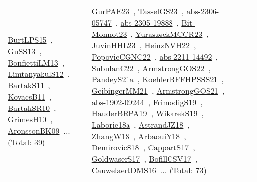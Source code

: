 {\begin{longtable}{lp{3cm}>{\raggedright\arraybackslash}p{6cm}>{\raggedright\arraybackslash}p{6cm}>{\raggedright\arraybackslash}p{8cm}}
\href{papers/BurtLPS15.pdf}{BurtLPS15}~\cite{BurtLPS15}, \href{papers/GuSS13.pdf}{GuSS13}~\cite{GuSS13}, \href{papers/BonfiettiLM13.pdf}{BonfiettiLM13}~\cite{BonfiettiLM13}, \href{articles/LimtanyakulS12.pdf}{LimtanyakulS12}~\cite{LimtanyakulS12}, \href{articles/BartakS11.pdf}{BartakS11}~\cite{BartakS11}, \href{articles/KovacsB11.pdf}{KovacsB11}~\cite{KovacsB11}, \href{articles/BartakSR10.pdf}{BartakSR10}~\cite{BartakSR10}, \href{papers/GrimesH10.pdf}{GrimesH10}~\cite{GrimesH10}, \href{papers/AronssonBK09.pdf}{AronssonBK09}~\cite{AronssonBK09}... (Total: 39) & \href{articles/GurPAE23.pdf}{GurPAE23}~\cite{GurPAE23}, \href{papers/TasselGS23.pdf}{TasselGS23}~\cite{TasselGS23}, \href{articles/abs-2306-05747.pdf}{abs-2306-05747}~\cite{abs-2306-05747}, \href{articles/abs-2305-19888.pdf}{abs-2305-19888}~\cite{abs-2305-19888}, \href{papers/Bit-Monnot23.pdf}{Bit-Monnot23}~\cite{Bit-Monnot23}, \href{articles/YuraszeckMCCR23.pdf}{YuraszeckMCCR23}~\cite{YuraszeckMCCR23}, \href{papers/JuvinHHL23.pdf}{JuvinHHL23}~\cite{JuvinHHL23}, \href{articles/HeinzNVH22.pdf}{HeinzNVH22}~\cite{HeinzNVH22}, \href{papers/PopovicCGNC22.pdf}{PopovicCGNC22}~\cite{PopovicCGNC22}, \href{articles/abs-2211-14492.pdf}{abs-2211-14492}~\cite{abs-2211-14492}, \href{articles/SubulanC22.pdf}{SubulanC22}~\cite{SubulanC22}, \href{papers/ArmstrongGOS22.pdf}{ArmstrongGOS22}~\cite{ArmstrongGOS22}, \href{articles/PandeyS21a.pdf}{PandeyS21a}~\cite{PandeyS21a}, \href{articles/KoehlerBFFHPSSS21.pdf}{KoehlerBFFHPSSS21}~\cite{KoehlerBFFHPSSS21}, \href{papers/GeibingerMM21.pdf}{GeibingerMM21}~\cite{GeibingerMM21}, \href{papers/ArmstrongGOS21.pdf}{ArmstrongGOS21}~\cite{ArmstrongGOS21}, \href{articles/abs-1902-09244.pdf}{abs-1902-09244}~\cite{abs-1902-09244}, \href{papers/FrimodigS19.pdf}{FrimodigS19}~\cite{FrimodigS19}, \href{articles/HauderBRPA19.pdf}{HauderBRPA19}~\cite{HauderBRPA19}, \href{articles/WikarekS19.pdf}{WikarekS19}~\cite{WikarekS19}, \href{papers/Laborie18a.pdf}{Laborie18a}~\cite{Laborie18a}, \href{papers/AstrandJZ18.pdf}{AstrandJZ18}~\cite{AstrandJZ18}, \href{articles/ZhangW18.pdf}{ZhangW18}~\cite{ZhangW18}, \href{papers/ArbaouiY18.pdf}{ArbaouiY18}~\cite{ArbaouiY18}, \href{papers/DemirovicS18.pdf}{DemirovicS18}~\cite{DemirovicS18}, \href{papers/CappartS17.pdf}{CappartS17}~\cite{CappartS17}, \href{papers/GoldwaserS17.pdf}{GoldwaserS17}~\cite{GoldwaserS17}, \href{papers/BofillCSV17.pdf}{BofillCSV17}~\cite{BofillCSV17}, \href{papers/CauwelaertDMS16.pdf}{CauwelaertDMS16}~\cite{CauwelaertDMS16}... (Total: 73)\\

\end{longtable}}
